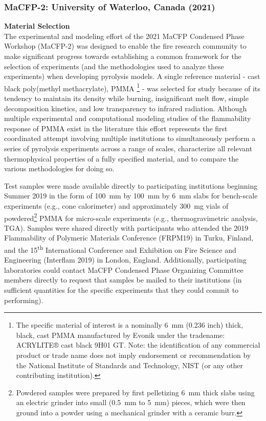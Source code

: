 \documentclass[12pt]{article}
\begin{document}
\subsubsection{MaCFP-2: University of Waterloo, Canada (2021)}

\textbf{Material Selection}\\
The experimental and modeling effort of the 2021 MaCFP Condensed Phase Workshop (MaCFP-2) was designed to enable the fire research community to make significant progress towards establishing a common framework for the selection of experiments (and the methodologies used to analyze these experiments) when developing pyrolysis models. A single reference material - cast black poly(methyl methacrylate), PMMA \footnote{The specific material of interest is a nominally 6~mm (0.236 inch) thick, black, cast PMMA manufactured by Evonik under the tradename: ACRYLITE® cast black 9H01 GT. Note: the identification of any commercial product or trade name does not imply endorsement or recommendation by the National Institute of Standards and Technology, NIST (or any other contributing institution).} - was selected for study because of its tendency to maintain its density while burning, insignificant melt flow, simple decomposition kinetics, and low transparency to infrared radiation. Although multiple experimental \cite{fiola2020comparison, kashiwagi1982study, hirata1985thermal, tewarson1992fire, rhodes1996burning} and computational modeling studies of the flammability response of PMMA exist in the literature \cite{fiola2020comparison, consalvi2008numerical, leventon2015flame, fukumoto2018large} this effort represents the first coordinated attempt involving multiple institutions to simultaneously perform a series of pyrolysis experiments across a range of scales, characterize all relevant thermophysical properties of a fully specified material, and to compare the various methodologies for doing so.

Test samples were made available directly to participating institutions beginning Summer 2019 in the form of 100~mm by 100~mm by 6~mm slabs for bench-scale experiments (e.g., cone calorimeter) and approximately 300~mg vials of powdered\footnote{Powdered samples were prepared by first pelletizing 6~mm thick slabs using an electric grinder into small (0.5~mm to 5~mm) pieces, which were then ground into a powder using a mechanical grinder with a ceramic burr.} PMMA for micro-scale experiments (e.g., thermogravimetric analysis, TGA). Samples were shared directly with participants who attended the 2019 Flammability of Polymeric Materials Conference (FRPM19) in Turku, Finland, and the 15\textsuperscript{th} International Conference and Exhibition on Fire Science and Engineering (Interflam 2019) in London, England. Additionally, participating laboratories could contact MaCFP Condensed Phase Organizing Committee members directly to request that samples be mailed to their institutions (in sufficient quantities for the specific experiments that they could commit to performing). \\
\end{document}
